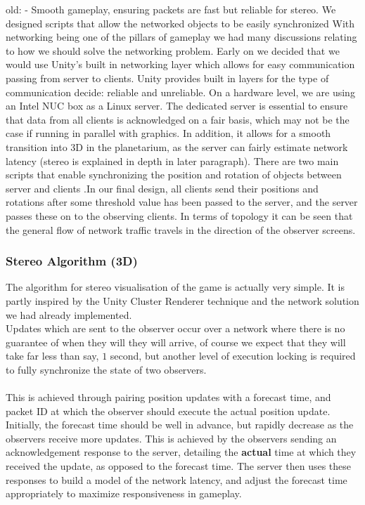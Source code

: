 \documentclass[11pt,a4paper]{article}
\begin{document}
  old:  - Smooth gameplay, ensuring packets are fast but reliable for stereo. We designed scripts that allow the networked objects to be easily synchronized
  With networking being one of the pillars of gameplay we had many discussions relating to how we should solve the networking problem. Early on we decided that we would use Unity’s built in networking layer which allows for easy communication passing from server to clients. Unity provides built in layers for the type of communication decide: reliable and unreliable.
  On a hardware level, we are using an Intel NUC box as a Linux server. The dedicated server is essential to ensure that data from all clients is acknowledged on a fair basis, which may not be the case if running in parallel with graphics. In addition, it allows for a smooth transition into 3D in the planetarium, as the server can fairly estimate network latency (stereo is explained in depth in later paragraph).
  There are two main scripts that enable synchronizing the position and rotation of objects between server and clients .In our final design, all clients send their positions and rotations after some threshold value has been passed to the server, and the server passes these on to the observing clients. In terms of topology it can be seen that the general flow of network traffic travels in the direction of the observer screens.
  

  \subsubsection{Stereo Algorithm (3D)}

  The algorithm for stereo visualisation of the game is actually very simple. It is partly inspired by the Unity Cluster Renderer technique and the network solution we had already implemented. \\
  Updates which are sent to the observer occur over a network where there is no guarantee of when they will they will arrive, of course we expect that they will take far less than say, $1$ second, but another level of execution locking is required to fully synchronize the state of two observers. \\ \\
  This is achieved through pairing position updates with a forecast time, and packet ID at which the observer should execute the actual position update. Initially, the forecast time should be well in advance, but rapidly decrease as the observers receive more updates. This is achieved by the observers sending an acknowledgement response to the server, detailing the \textbf{actual} time at which they received the update, as opposed to the forecast time. The server then uses these responses to build a model of the network latency, and adjust the forecast time appropriately to maximize responsiveness in gameplay.
\end{document}
